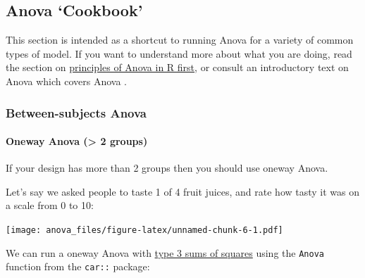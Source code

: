 \documentclass[]{article}
\let\oldparagraph\paragraph
\renewcommand{\paragraph}[1]{\oldparagraph{#1}\mbox{}}
\begin{document}
\hypertarget{anova-cookbook}{%
\subsection*{Anova `Cookbook'}\label{anova-cookbook}}

This section is intended as a shortcut to running Anova for a variety of common
types of model. If you want to understand more about what you are doing, read
the section on \protect\hyperlink{anova}{principles of Anova in R first}, or consult an
introductory text on Anova which covers Anova \citep[e.g.][]{howell2012statistical}.

\hypertarget{between-subjects-anova}{%
\subsubsection*{Between-subjects Anova}\label{between-subjects-anova}}

\hypertarget{oneway-anova}{%
\paragraph{Oneway Anova (\textgreater{} 2 groups)}\label{oneway-anova}}

If your design has more than 2 groups then you should use oneway Anova.

Let's say we asked people to taste 1 of 4 fruit juices, and rate how tasty it
was on a scale from 0 to 10:

\texttt{[image: anova\_files/figure-latex/unnamed-chunk-6-1.pdf]}

We can run a oneway Anova with \protect\hyperlink{sums-squares}{type 3 sums of squares} using the
\texttt{Anova} function from the \texttt{car::} package:
\end{document}
